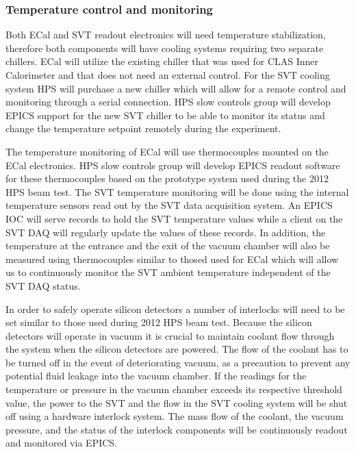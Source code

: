 \subsubsection{Temperature control and monitoring}
\label{sec:ctrl:temp}
Both ECal and SVT readout electronics will need temperature stabilization, therefore both components  
will have cooling systems requiring two separate chillers. ECal will utilize the 
existing chiller that was used for CLAS Inner Calorimeter and that does not need an external 
control. For the SVT cooling system HPS will purchase a new chiller which will allow for a remote control 
and monitoring through a serial connection. HPS slow controls group will develop EPICS support for the new SVT 
chiller to be able to monitor its status and change the temperature setpoint remotely during the experiment.   

The temperature monitoring of ECal will use thermocouples mounted on the ECal electronics. HPS slow controls group will 
develop EPICS readout software for these thermocouples based on the prototype system 
used during the 2012 HPS beam test. The SVT temperature monitoring will be done using the internal temperature 
sensors read out by the SVT data acquisition system. An EPICS IOC will serve records to hold the SVT temperature 
values while a client on the SVT DAQ will regularly update the values of these records. In addition, 
the temperature at the entrance and the exit of the vacuum chamber will also be measured  
using thermocouples similar to thosed used for ECal which will allow us to continuously monitor the SVT ambient 
temperature independent of the SVT DAQ status.  

In order to safely operate silicon detectors a number of interlocks will need to be set similar to those 
used during 2012 HPS beam test.  Because the silicon detectors will operate in vacuum it is crucial 
to maintain  coolant flow through the system when the silicon detectors are powered. The flow of the 
coolant has to be turned off in the event of deteriorating vacuum, as a precaution to prevent any potential fluid 
leakage into the vacuum chamber. If the readings for the temperature or pressure in the vacuum chamber exceeds its
respective threshold value, the power to the SVT and the flow in the SVT cooling system
will be shut off using a hardware interlock system. The mass flow of the coolant, the vacuum 
pressure, and the status of the interlock components will be continuously readout and monitored via EPICS.

